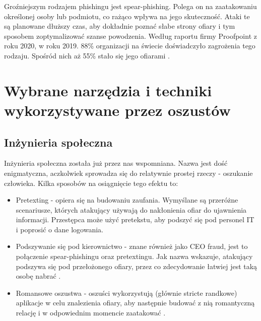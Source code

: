 \documentclass[]{article}
\begin{document}
Groźniejszym rodzajem phishingu jest spear-phishing. Polega on na zaatakowaniu określonej osoby lub podmiotu, co rażąco wpływa na jego skuteczność. Ataki te są planowane dłuższy czas, aby dokładnie poznać słabe strony ofiary i tym sposobem zoptymalizować szanse powodzenia. Według raportu firmy Proofpoint z roku 2020, w roku 2019. 88\% organizacji na świecie doświadczyło zagrożenia tego rodzaju. Spośród nich aż 55\% stało się jego ofiarami \cite{proofpoint2020}.


\newpage
\section{Wybrane narzędzia i techniki wykorzystywane przez oszustów}

\subsection{Inżynieria społeczna}
Inżynieria społeczna została już przez nas wspomniana. Nazwa jest dość enigmatyczna, aczkolwiek sprowadza się do relatywnie prostej rzeczy - oszukanie człowieka. Kilka sposobów na osiągnięcie tego efektu to:
\begin{itemize}[label=$\rightarrow$]
	\item Pretexting - opiera się na budowaniu zaufania. Wymyślane są przeróżne scenariusze, których atakujący używają do nakłonienia ofiar do ujawnienia informacji. Przestępca może użyć pretekstu, aby podszyć się pod personel IT i poprosić o dane logowania.
	\item Podszywanie się pod kierownictwo - znane również jako CEO fraud, jest to połączenie spear-phishingu oraz pretextingu. Jak nazwa wskazuje, atakujący podszywa się pod przełożonego ofiary, przez co zdecydowanie łatwiej jest taką osobę nabrać .
	\item Romansowe oszustwa - oszuści wykorzystują (głównie stricte randkowe) aplikacje w celu znalezienia ofiary, aby następnie budować z nią romantyczną relację i w odpowiednim momencie zaatakować \cite{abnormal_phishingtypes}.
\end{itemize} 
\end{document}
